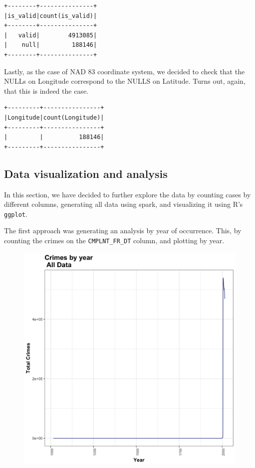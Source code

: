 \documentclass{article}
\begin{document}
\begin{itemize}
\begin{verbatim}
+--------+---------------+
|is_valid|count(is_valid)|
+--------+---------------+
|   valid|        4913085|
|    null|         188146|
+--------+---------------+
\end{verbatim}

Lastly, as the case of NAD 83 coordinate system, we decided to check that the NULLs on Longitude correspond to the NULLS on Latitude. Turns out, again, that this is indeed the case. 

\begin{verbatim}
+---------+----------------+
|Longitude|count(Longitude)|
+---------+----------------+
|         |          188146|
+---------+----------------+
\end{verbatim}
\end{itemize}

\subsection{Data visualization and analysis}

In this section, we have decided to further explore the data by counting cases by different columns, generating all data using spark, and visualizing it using R's \texttt{ggplot}. 

The first approach was generating an analysis by year of occurrence. This, by counting the crimes on the \texttt{CMPLNT\_FR\_DT} column, and plotting by year. 

\begin{figure}[H]
\centering
\includegraphics[scale=0.15]{1_YearlyAll.png}
\end{figure}
\end{document}
